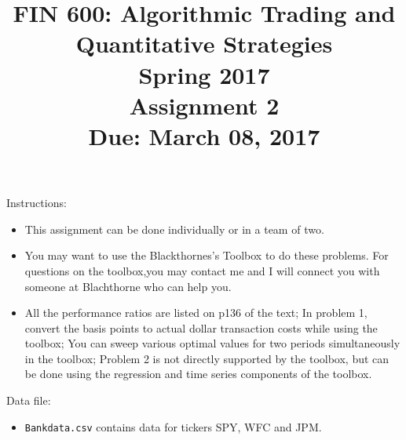 \documentclass[12pt]{article}
\title{FIN 600: Algorithmic Trading and Quantitative Strategies\\ Spring 2017 \\ \vspace{5mm}Assignment 2\\\vspace{10mm}Due: March 08, 2017}
\date{}
\begin{document}
\maketitle

Instructions:
\begin{itemize}
\itemsep 3mm
\item This assignment can be done individually or in a team of two.
\item You may want to use the Blackthornes's Toolbox to do these problems. For questions on the toolbox,you may contact me and I will connect you with someone at Blachthorne who can help you.
\item All the performance ratios are listed on p136 of the text; In problem 1, convert the basis points to actual dollar transaction costs while using the toolbox; You can sweep various optimal values for two periods simultaneously in the toolbox; Problem 2 is not directly supported by the toolbox, but can be done using the regression and time series components of the toolbox.
\end{itemize}

\vspace{5mm}
Data file:
\begin{itemize}

\item {\tt{Bankdata.csv}} contains data for tickers SPY, WFC and JPM.
\end{itemize}
\pagebreak
\end{document}
